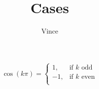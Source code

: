 \documentclass{article}
\title{Cases}
\author{Vince}
\begin{document}
\maketitle


\[
\cos(k\pi)=\begin{cases}
1, &\text{if \(k\) odd}\\
-1, &\text{if \(k\) even}\\
\end{cases}
\]
\end{document}
